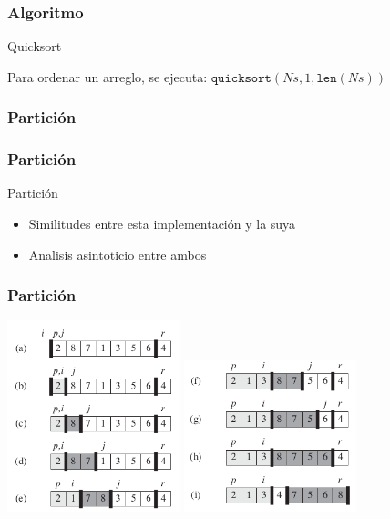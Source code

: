 \documentclass{beamer}
\begin{document}
\begin{frame}

\frametitle{Algoritmo}
\begin{algorithm}[H]
    \caption{Quicksort}
    \begin{algorithmic}[1]
    \EndIf
    \EndProcedure
    \end{algorithmic}
\end{algorithm}

Para ordenar un arreglo, se ejecuta: $\mathtt{quicksort}(Ns,1,\mathtt{len}(Ns))$

\end{frame}

\begin{frame}
\frametitle{Partici\'on}

\end{frame}

\begin{frame}
\frametitle{Partici\'on}

\begin{algorithm}[H]
    \caption{Partici\'on}
    \begin{algorithmic}[1]
    \EndIf
    \EndFor
    \State {}
    \EndProcedure
    \end{algorithmic}
\end{algorithm}
\begin{itemize}
\item{Similitudes entre esta implementaci\'on y la suya}
\item{Analisis asintoticio entre ambos}
\end{itemize}

\end{frame}

\begin{frame}
\frametitle{Partici\'on}
\includegraphics[width=5cm]{particion1.png}
\includegraphics[width=5cm]{particion2.png}
\end{frame}
\end{document}
